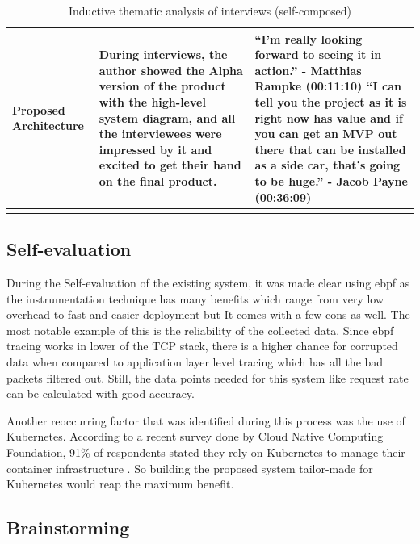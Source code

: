 \begin{longtable}{|p{30mm}|p{61mm}|p{60mm}|}
    
    Proposed Architecture &
    During interviews, the author showed the Alpha version of the product with the high-level system diagram, and all the interviewees were impressed by it and excited to get their hand on the final product. &
    “I'm really looking forward to seeing it in action.”  \newline- Matthias Rampke (00:11:10)
    \newline
    \newline
    “I can tell you the project as it is right now has value and if you can get an MVP out there that can be installed as a side car, that's going to be huge.” \newline- Jacob Payne (00:36:09) \\ \hline

\caption{Inductive thematic analysis of interviews (self-composed)}
\end{longtable}

\subsection{Self-evaluation}

During the Self-evaluation of the existing system, it was made clear using \ac{ebpf} as the instrumentation technique has many benefits which range from very low overhead to fast and easier deployment but It comes with a few cons as well. The most notable example of this is the reliability of the collected data. Since \ac{ebpf} tracing works in lower of the TCP stack, there is a higher chance for corrupted data when compared to application layer level tracing which has all the bad packets filtered out. Still, the data points needed for this system like request rate can be calculated with good accuracy.

Another reoccurring factor that was identified during this process was the use of Kubernetes. According to a recent survey done by Cloud Native Computing Foundation, 91\% of respondents stated they rely on Kubernetes to manage their container infrastructure \citep{CloudNat36:online}. So building the proposed system tailor-made for Kubernetes would reap the maximum benefit.

\subsection{Brainstorming}

